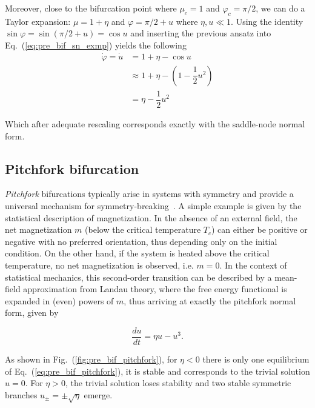 \begin{exmp}
    Moreover, close to the bifurcation point where $\mu_c = 1$ and $\varphi_c = \pi/2$,
    we can do a Taylor expansion: $\mu = 1 + \eta$ and $\varphi = \pi/2 + u$ 
    where $\eta, u \ll 1$. Using the identity $\sin \varphi = \sin (\pi/2 + u) = \cos u$
    and inserting the previous ansatz into Eq.~(\ref{eq:pre_bif_sn_exmp}) yields
    the following
    \begin{align*}
        \dot{\varphi} = \dot{u} &= 1 + \eta - \cos u \\ 
        &\approx 1 + \eta - (1 - \dfrac12 u^2) \\
        &= \eta - \dfrac12 u^2
    \end{align*}

    Which after adequate rescaling corresponds exactly with the saddle-node
    normal form.
    

\end{exmp}

\subsection{Pitchfork bifurcation}

{\em Pitchfork} bifurcations typically arise in systems with symmetry and 
provide a universal mechanism for symmetry-breaking~\cite{strogatz2018nonlinear}. 
A simple example is given by the statistical description of magnetization. 
In the absence of an external field, the net magnetization $m$ 
(below the critical temperature $T_c$) can either be positive or negative 
with no preferred orientation, thus depending only on the initial condition. On the
other hand, if the system is heated above the critical temperature, no net magnetization
is observed, i.e. $m=0$. In the context of statistical mechanics, this second-order
transition can be described by a mean-field approximation from Landau theory\cite{kardar2007statistical}, where
the free energy functional is expanded in (even) powers of $m$, thus arriving at exactly
the pitchfork normal form, given by

\begin{equation}
    \dfrac{du}{dt} = \eta u - u ^ 3.
    \label{eq:pre_bif_pitchfork}
\end{equation}

As shown in Fig.~(\ref{fig:pre_bif_pitchfork}), for $\eta < 0$ there is only one 
equilibrium of Eq.~(\ref{eq:pre_bif_pitchfork}), it is stable and corresponds
to the trivial solution $u=0$. For $\eta > 0$, the trivial solution loses stability
and two stable symmetric branches $u_\pm = \pm \sqrt{\eta}$ emerge. 

